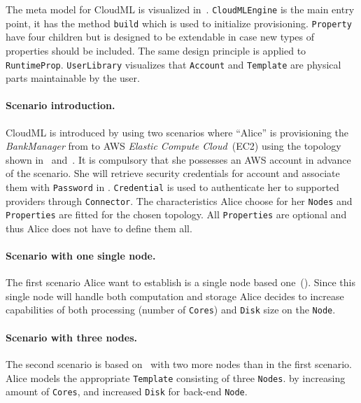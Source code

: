 The meta model for CloudML is visualized in~. 
\texttt{CloudMLEngine} is the main entry point, it has the method \texttt{build}
which is used to initialize provisioning.
\texttt{Property} have four children but is designed to be extendable in case
new types of properties should be included. The same design principle
is applied to \texttt{RuntimeProp}.
\texttt{UserLibrary} visualizes that \texttt{Account} and \texttt{Template} are 
physical parts maintainable by the user.

\paragraph{Scenario introduction.}
CloudML is introduced by using two scenarios where ``Alice'' is provisioning the 
\emph{BankManager} from  to AWS \emph{Elastic Compute Cloud}~(EC2)
using the topology shown in~ and~.
It is compulsory that she possesses an AWS account in advance of the scenario.
She will retrieve security credentials for account 
and associate them with \texttt{Password} in .
\texttt{Credential} is used to authenticate her to supported providers through \texttt{Connector}.
The characteristics Alice choose for her \texttt{Nodes} and \texttt{Properties} are fitted
for the chosen topology.
All \texttt{Properties} are optional and thus Alice does not have to define them all.

\paragraph{Scenario with one single node.}
The first scenario Alice want to establish is a single node based one~().
Since this single node will handle both computation and storage Alice decides to 
increase capabilities of both processing (number of \texttt{Cores}) and 
\texttt{Disk} size on the \texttt{Node}.

\paragraph{Scenario with three nodes.}
The second scenario is based on~ with two more nodes than in the first scenario.
Alice models the appropriate \texttt{Template} consisting
of three \texttt{Nodes}.
by increasing amount of \texttt{Cores}, and increased \texttt{Disk} for back-end \texttt{Node}.

